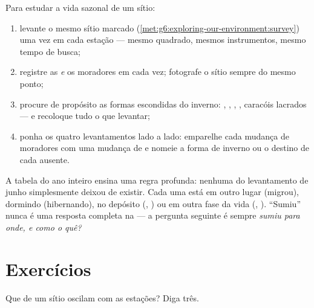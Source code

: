 \begin{method}\label{met:g6:life-through-seasons:yearsurvey}
Para estudar a vida sazonal de um sítio:
\begin{enumerate}
  \item levante o mesmo sítio marcado
        (\cref{met:g6:exploring-our-environment:survey}) uma vez em
        cada estação --- mesmo quadrado, mesmos instrumentos, mesmo
        tempo de busca;
  \item registre as  \emph{e} os moradores em cada vez;
        fotografe o sítio sempre do mesmo ponto;
  \item procure de propósito as formas escondidas do inverno:
        , , , , caracóis lacrados --- e
        recoloque tudo o que levantar;
  \item ponha os quatro levantamentos lado a lado: emparelhe cada
        mudança de moradores com uma mudança de  e nomeie a
        forma de inverno ou o destino de cada ausente.
\end{enumerate}
\end{method}

\begin{remark}\label{rem:g6:life-through-seasons:vanish}
A tabela do ano inteiro ensina uma regra profunda: nenhuma  do
levantamento de junho simplesmente deixou de existir. Cada uma está
em outro lugar (migrou), dormindo (hibernando), no depósito (,
) ou em outra fase da vida (, ). ``Sumiu'' nunca é
uma resposta completa na  --- a pergunta seguinte é sempre
\emph{sumiu para onde, e como o quê?}
\end{remark}

\section{Exercícios}

\begin{exercise}[$\star$]\label{exo:g6:life-through-seasons:1}
Que  de um sítio oscilam com as estações? Diga três.
\end{exercise}

